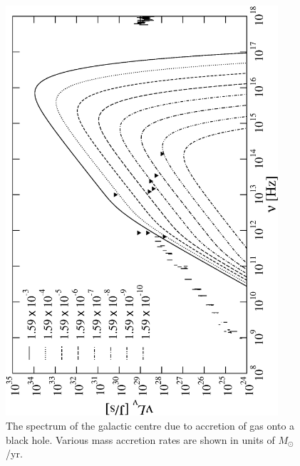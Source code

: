 \begin{figure}[p]
	\begin{center}
	\includegraphics[angle=-90,width=0.9\textwidth]{eps/spectrum-BH-lotsofmdot.eps}
	\caption{The spectrum of the galactic centre due to accretion of gas onto a black hole. Various mass accretion rates are shown in
	units of $M_\odot$/yr.}
	\label{fig_accretionspectrumblackholem}
	\end{center}
\end{figure}
